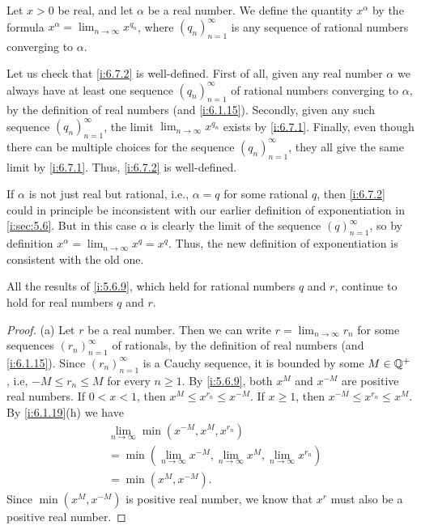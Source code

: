 \begin{defn}\label{i:6.7.2}
  Let \(x > 0\) be real, and let \(\alpha\) be a real number.
  We define the quantity \(x^\alpha\) by the formula \(x^\alpha = \lim_{n \to \infty} x^{q_n}\), where \((q_n)_{n = 1}^\infty\) is any sequence of rational numbers converging to \(\alpha\).
\end{defn}

\begin{note}
  Let us check that \cref{i:6.7.2} is well-defined.
  First of all, given any real number \(\alpha\) we always have at least one sequence \((q_n)_{n = 1}^\infty\) of rational numbers converging to \(\alpha\), by the definition of real numbers (and \cref{i:6.1.15}).
  Secondly, given any such sequence \((q_n)_{n = 1}^\infty\), the limit \(\lim_{n \to \infty} x^{q_n}\) exists by \cref{i:6.7.1}.
  Finally, even though there can be multiple choices for the sequence \((q_n)_{n = 1}^\infty\), they all give the same limit by \cref{i:6.7.1}.
  Thus, \cref{i:6.7.2} is well-defined.
\end{note}

\begin{note}
  If \(\alpha\) is not just real but rational, i.e., \(\alpha = q\) for some rational \(q\), then \cref{i:6.7.2} could in principle be inconsistent with our earlier definition of exponentiation in \cref{i:sec:5.6}.
  But in this case \(\alpha\) is clearly the limit of the sequence \((q)_{n = 1}^\infty\), so by definition \(x^\alpha = \lim_{n \to \infty} x^q = x^q\).
  Thus, the new definition of exponentiation is consistent with the old one.
\end{note}

\begin{prop}\label{i:6.7.3}
  All the results of \cref{i:5.6.9}, which held for rational numbers \(q\) and \(r\), continue to hold for real numbers \(q\) and \(r\).
\end{prop}

\begin{proof}{(a)}
  Let \(r\) be a real number.
  Then we can write \(r = \lim_{n \to \infty} r_n\) for some sequences \((r_n)_{n = 1}^\infty\) of rationals, by the definition of real numbers (and \cref{i:6.1.15}).
  Since \((r_n)_{n = 1}^\infty\) is a Cauchy sequence, it is bounded by some \(M \in \mathbb{Q}^+\), i.e, \(-M \leq r_n \leq M\) for every \(n \geq 1\).
  By \cref{i:5.6.9}, both \(x^M\) and \(x^{-M}\) are positive real numbers.
  If \(0 < x < 1\), then \(x^M \leq x^{r_n} \leq x^{-M}\).
  If \(x \geq 1\), then \(x^{-M} \leq x^{r_n} \leq x^M\).
  By \cref{i:6.1.19}(h) we have
  \begin{align*}
     & \lim_{n \to \infty} \min(x^{-M}, x^M, x^{r_n})                                           \\
     & = \min(\lim_{n \to \infty} x^{-M}, \lim_{n \to \infty} x^M, \lim_{n \to \infty} x^{r_n}) \\
     & = \min(x^M, x^{-M}).
  \end{align*}
  Since \(\min(x^M, x^{-M})\) is positive real number, we know that \(x^r\) must also be a positive real number.
\end{proof}


